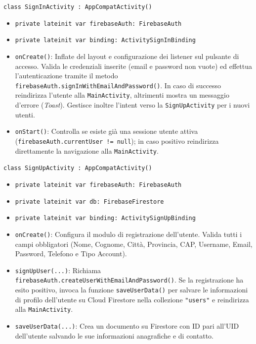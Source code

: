 \documentclass[a4paper]{report}
\begin{document}
\texttt{class SignInActivity : AppCompatActivity()}
\begin{itemize}
    \item \texttt{private lateinit var firebaseAuth: FirebaseAuth}
    \item \texttt{private lateinit var binding: ActivitySignInBinding}
    \item \texttt{onCreate()}: Inflate del layout e configurazione dei listener sul pulsante di accesso. Valida le credenziali inserite (email e password non vuote) ed effettua l'autenticazione tramite il metodo \texttt{firebaseAuth.signInWithEmailAndPassword()}. In caso di successo reindirizza l'utente alla \texttt{MainActivity}, altrimenti mostra un messaggio d'errore (\textit{Toast}). Gestisce inoltre l'intent verso la \texttt{SignUpActivity} per i nuovi utenti.
    \item \texttt{onStart()}: Controlla se esiste già una sessione utente attiva (\texttt{firebaseAuth.currentUser != null}); in caso positivo reindirizza direttamente la navigazione alla \texttt{MainActivity}.
\end{itemize}

\texttt{class SignUpActivity : AppCompatActivity()}
\begin{itemize}
    \item \texttt{private lateinit var firebaseAuth: FirebaseAuth}
    \item \texttt{private lateinit var db: FirebaseFirestore}
    \item \texttt{private lateinit var binding: ActivitySignUpBinding}
    \item \texttt{onCreate()}: Configura il modulo di registrazione dell'utente. Valida tutti i campi obbligatori (Nome, Cognome, Città, Provincia, CAP, Username, Email, Password, Telefono e Tipo Account).
    \item \texttt{signUpUser(...)}: Richiama \texttt{firebaseAuth.createUserWithEmailAndPassword()}. Se la registrazione ha esito positivo, invoca la funzione \texttt{saveUserData()} per salvare le informazioni di profilo dell'utente su Cloud Firestore nella collezione \texttt{"users"} e reindirizza alla \texttt{MainActivity}.
    \item \texttt{saveUserData(...)}: Crea un documento su Firestore con ID pari all'UID dell'utente salvando le sue informazioni anagrafiche e di contatto.
\end{itemize}
\end{document}
